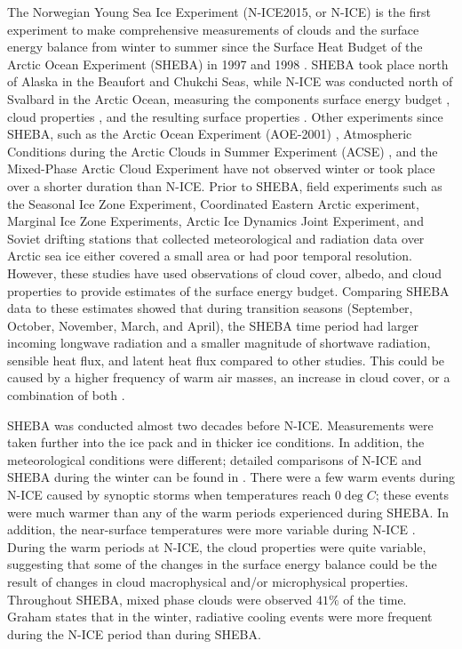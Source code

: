 The Norwegian Young Sea Ice Experiment (N-ICE2015, or N-ICE) \cite{granskog:2018} is the first experiment to make comprehensive measurements of clouds and the surface energy balance from winter to summer since the Surface Heat Budget of the Arctic Ocean Experiment (SHEBA) in 1997 and 1998 \cite{walden:2017, uttal:2002}. SHEBA took place north of Alaska in the Beaufort and Chukchi Seas, while N-ICE was conducted north of Svalbard in the Arctic Ocean, measuring the components surface energy budget \cite{persson:2002, andreas:2010, grachev:2007}, cloud properties \cite{turner:2005, turner:2002, intrieri:2002, shupe:2004}, and the resulting surface properties \cite{intrieri:2002, shupe:2004}. Other experiments since SHEBA, such as the Arctic Ocean Experiment (AOE-2001) \cite{tjernstrom:2005}, Atmospheric Conditions during the Arctic Clouds in Summer Experiment (ACSE) \cite{sotiropoulou:2016}, and the Mixed-Phase Arctic Cloud Experiment \cite{verlinde:2007} have not observed winter or took place over a shorter duration than N-ICE. Prior to SHEBA, field experiments such as the Seasonal Ice Zone Experiment, Coordinated Eastern Arctic experiment, Marginal Ice Zone Experiments, Arctic Ice Dynamics Joint Experiment, and Soviet drifting stations \cite{vihma:2005, kahl:1999} that collected meteorological and radiation data over Arctic sea ice either covered a small area or had poor temporal resolution. However, these studies have used observations of cloud cover, albedo, and cloud properties to provide estimates of the surface energy budget. Comparing SHEBA data to these estimates showed that during transition seasons (September, October, November, March, and April), the SHEBA time period had larger incoming longwave radiation and a smaller magnitude of shortwave radiation, sensible heat flux, and latent heat flux compared to other studies. This could be caused by a higher frequency of warm air masses, an increase in cloud cover, or a combination of both \cite{persson:2002}. 

SHEBA was conducted almost two decades before N-ICE. Measurements were taken further into the ice pack \cite{cohen:2017} and in thicker ice conditions. In addition, the meteorological conditions were different; detailed comparisons of N-ICE and SHEBA during the winter can be found in \cite{graham:2017}. There were a few warm events during N-ICE caused by synoptic storms when temperatures reach $0 \deg C$; these events were much warmer than any of the warm periods experienced during SHEBA. In addition, the near-surface temperatures were more variable during N-ICE \cite{cohen:2017}. During the warm periods at N-ICE, the cloud properties were quite variable, suggesting that some of the changes in the surface energy balance could be the result of changes in cloud macrophysical and/or microphysical properties. Throughout SHEBA, mixed phase clouds were observed $41 \%$ of the time. Graham \cite{graham:2017} states that in the winter, radiative cooling events were more frequent during the N-ICE period than during SHEBA. 

